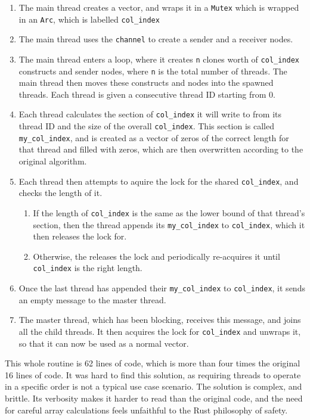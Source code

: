 \begin{enumerate}
    \item The main thread creates a vector, and wraps it in a \texttt{Mutex} which is wrapped in an \texttt{Arc}, which is labelled \texttt{col\_index}
    \item The main thread uses the \texttt{channel} to create a sender and a receiver nodes.
    \item The main thread enters a loop, where it creates \texttt{n} clones worth of \texttt{col\_index} constructs and sender nodes, where \texttt{n} is the total number of threads. The main thread then moves these constructs and nodes into the spawned threads. Each thread is given a consecutive thread ID starting from 0.
    \item Each thread calculates the section of \texttt{col\_index} it will write to from its thread ID and the size of the overall \texttt{col\_index}. This section is called \texttt{my\_col\_index}, and is created as a vector of zeros of the correct length for that thread and filled with zeros, which are then overwritten according to the original algorithm.
    \item Each thread then attempts to aquire the lock for the shared \texttt{col\_index}, and checks the length of it.
    \begin{enumerate}
        \item If the length of \texttt{col\_index} is the same as the lower bound of that thread's section, then the thread appends its \texttt{my\_col\_index} to \texttt{col\_index}, which it then releases the lock for.
        \item Otherwise, the releases the lock and periodically re-acquires it until \texttt{col\_index} is the right length.
    \end{enumerate}
\item Once the last thread has appended their \texttt{my\_col\_index} to \texttt{col\_index}, it sends an empty message to the master thread.
\item The master thread, which has been blocking, receives this message, and joins all the child threads. It then acquires the lock for \texttt{col\_index} and unwraps it, so that it can now be used as a normal vector.
\end{enumerate}

This whole routine is 62 lines of code, which is more than four times the original 16 lines of code. It was hard to find this solution, as requiring threads to operate in a specific order is not a typical use case scenario. 
The solution is complex, and brittle. Its verbosity makes it harder to read than the original code, and the need for careful array calculations feels unfaithful to the Rust philosophy of safety.

